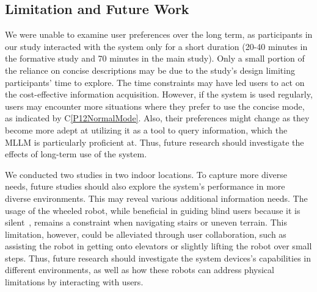 \subsection{Limitation and Future Work}
We were unable to examine user preferences over the long term, as participants in our study interacted with the system only for a short duration (20-40 minutes in the formative study and 70 minutes in the main study). 
Only a small portion of the reliance on concise descriptions may be due to the study's design limiting participants' time to explore.
The time constraints may have led users to act on the cost-effective information acquisition.
However, if the system is used regularly, users may encounter more situations where they prefer to use the concise mode, as indicated by C\ref{P12NormalMode}. 
Also, their preferences might change as they become more adept at utilizing it as a tool to query information, which the MLLM is particularly proficient at.
Thus, future research should investigate the effects of long-term use of the system.

We conducted two studies in two indoor locations. 
To capture more diverse needs, future studies should also explore the system’s performance in more diverse environments. 
This may reveal various additional information needs. 
The usage of the wheeled robot, while beneficial in guiding blind users because it is silent~\cite {wang2022can}, remains a constraint when navigating stairs or uneven terrain. 
This limitation, however, could be alleviated through user collaboration, such as assisting the robot in getting onto elevators or slightly lifting the robot over small steps.
Thus, future research should investigate the system devices's capabilities in different environments, as well as how these robots can address physical limitations by interacting with users.

